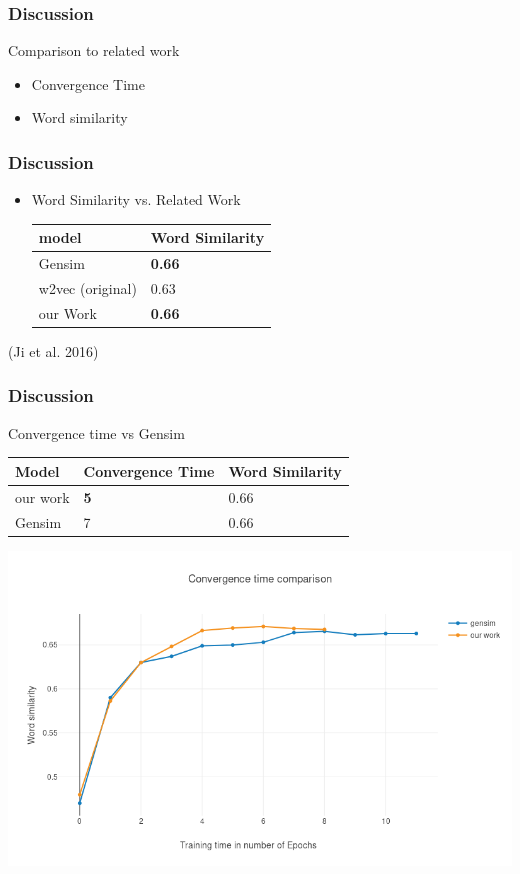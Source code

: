 \begin{frame}
\frametitle{Discussion}
Comparison to related work
\begin{itemize}
\item Convergence Time
\item Word similarity
\end{itemize}
\end{frame}
\begin{frame}
\frametitle{Discussion}
\begin{itemize}

\item Word Similarity vs. Related Work
\begin{table}[]
\begin{tabular}{|l|l|}
\hline
model         & Word Similarity \\ \hline
Gensim           & \textbf{ 0.66   }        \\ \hline
w2vec (original) & 0.63           \\ \hline
our Work         & \textbf{0.66}       \\ \hline
\end{tabular}
\end{table}
\end{itemize}
\hfill (Ji et al. 2016)
\end{frame}

\begin{frame}
\frametitle{Discussion}
Convergence time vs Gensim 
    \begin{table}[]
\begin{tabular}{|l|l|l|}
\hline
Model    & Convergence Time & Word Similarity \\ \hline
our work & \textbf{5}              & 0.66            \\ \hline
Gensim   & 7           & 0.66            \\ \hline
\end{tabular}
\end{table}
\includegraphics[scale=0.3]{images/gensim_vs_adam}
  
  \end{frame}